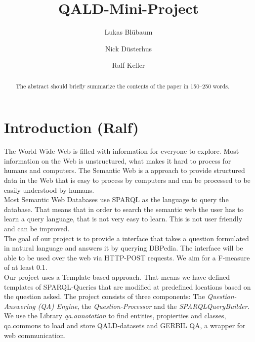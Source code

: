 \documentclass[runningheads]{llncs}
\begin{document}
%
\title{QALD-Mini-Project}
%
%
\author{Lukas Bl{\"u}baum \and
Nick D{\"u}sterhus \and
Ralf Keller}
%
%

%
\maketitle              %
%
\begin{abstract}
The abstract should briefly summarize the contents of the paper in
150--250 words.

\end{abstract}
%
%
%
\section{Introduction (Ralf)}  

The World Wide Web is filled with information for everyone to explore. Most information on the Web is unstructured, what makes it hard to process for humans and computers. The Semantic Web is a approach to provide structured data in the Web that is easy to process by computers and can be processed to be easily understood by humans. \\

Most Semantic Web Databases use SPARQL as the language to query the database. That means that in order to search the semantic web the user has to learn a query language, that is not very easy to learn. This is not user friendly and can be improved. \\

The goal of our project is to provide a interface that takes a question formulated in natural language and answers it by querying DBPedia. The interface will be able to be used over the web via HTTP-POST requests. We aim for a F-measure of at least 0.1. \\

Our project uses a Template-based approach. That means we have defined templates of SPARQL-Queries that are modified at predefined locations based on the question asked. The project consists of three components: The \emph{Question-Answering (QA) Engine}, the \emph{Question-Processor} and the \emph{SPARQLQueryBuilder}. We use the Library \emph{qa.annotation} to find entities, propierties and classes, qa.commons to load and store QALD-datasets and GERBIL QA, a wrapper for web communication.   \\
\end{document}
